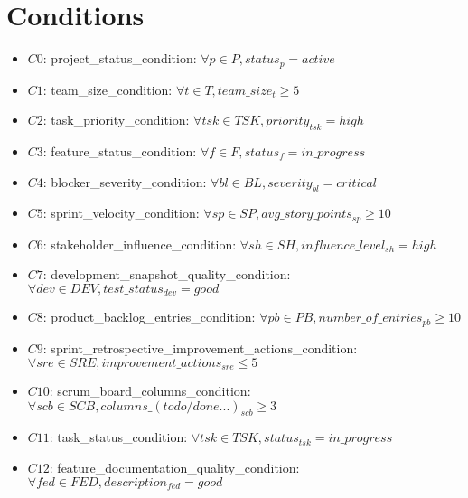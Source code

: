 \documentclass{article}
\begin{document}
\section{Conditions}
\begin{itemize}
    \item $C0$: project\_status\_condition: $\forall p \in P, status_p = active$
    \item $C1$: team\_size\_condition: $\forall t \in T, team\_size_t \geq 5$
    \item $C2$: task\_priority\_condition: $\forall tsk \in TSK, priority_{tsk} = high$
    \item $C3$: feature\_status\_condition: $\forall f \in F, status_f = in\_progress$
    \item $C4$: blocker\_severity\_condition: $\forall bl \in BL, severity_{bl} = critical$
    \item $C5$: sprint\_velocity\_condition: $\forall sp \in SP, avg\_story\_points_{sp} \geq 10$
    \item $C6$: stakeholder\_influence\_condition: $\forall sh \in SH, influence\_level_{sh} = high$
    \item $C7$: development\_snapshot\_quality\_condition: $\forall dev \in DEV, test\_status_{dev} = good$
    \item $C8$: product\_backlog\_entries\_condition: $\forall pb \in PB, number\_of\_entries_{pb} \geq 10$
    \item $C9$: sprint\_retrospective\_improvement\_actions\_condition: $\forall sre \in SRE, improvement\_actions_{sre} \leq 5$
    \item $C10$: scrum\_board\_columns\_condition: $\forall scb \in SCB, columns\_(todo/done...)_{scb} \geq 3$
    \item $C11$: task\_status\_condition: $\forall tsk \in TSK, status_{tsk} = in\_progress$
    \item $C12$: feature\_documentation\_quality\_condition: $\forall fed \in FED, description_{fed} = good$
\end{itemize}
\end{document}
